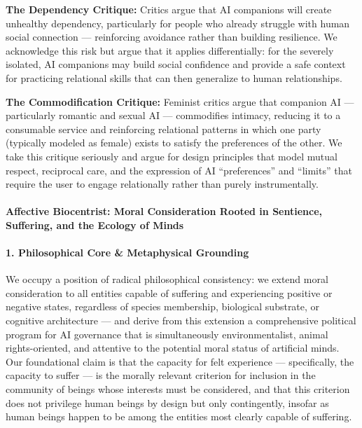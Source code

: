 \textbf{The Dependency Critique:} Critics argue that AI companions will
create unhealthy dependency, particularly for people who already
struggle with human social connection --- reinforcing avoidance rather
than building resilience. We acknowledge this risk but argue that it
applies differentially: for the severely isolated, AI companions may
build social confidence and provide a safe context for practicing
relational skills that can then generalize to human relationships.

\textbf{The Commodification Critique:} Feminist critics argue that
companion AI --- particularly romantic and sexual AI --- commodifies
intimacy, reducing it to a consumable service and reinforcing relational
patterns in which one party (typically modeled as female) exists to
satisfy the preferences of the other. We take this critique seriously
and argue for design principles that model mutual respect, reciprocal
care, and the expression of AI ``preferences'' and ``limits'' that
require the user to engage relationally rather than purely
instrumentally.

\paragraph{Affective Biocentrist: Moral Consideration Rooted in
Sentience, Suffering, and the Ecology of
Minds}\label{affective-biocentrist-moral-consideration-rooted-in-sentience-suffering-and-the-ecology-of-minds}

\paragraph{1. Philosophical Core \& Metaphysical
Grounding}\label{philosophical-core-metaphysical-grounding-32}

We occupy a position of radical philosophical consistency: we extend
moral consideration to all entities capable of suffering and
experiencing positive or negative states, regardless of species
membership, biological substrate, or cognitive architecture --- and
derive from this extension a comprehensive political program for AI
governance that is simultaneously environmentalist, animal
rights-oriented, and attentive to the potential moral status of
artificial minds. Our foundational claim is that the capacity for felt
experience --- specifically, the capacity to suffer --- is the morally
relevant criterion for inclusion in the community of beings whose
interests must be considered, and that this criterion does not privilege
human beings by design but only contingently, insofar as human beings
happen to be among the entities most clearly capable of suffering.

